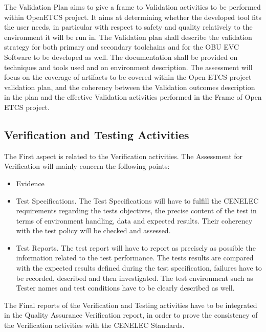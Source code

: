 \documentclass{template/openetcs_report}
\begin{document}
The Validation Plan aims to give a frame to Validation activities to be performed within OpenETCS project. It aims at determining whether the developed tool fits the user needs, in particular with respect to safety and quality relatively to the environment it will be run in.
The Validation plan shall describe the validation strategy for both primary and secondary toolchains and for the OBU EVC Software to be developed as well. The documentation shall be provided on techniques and tools used and on environment description. The assessment will focus on the coverage of artifacts to be covered within the Open ETCS project validation plan, and the coherency between the Validation outcomes description in the plan and the effective Validation activities performed in the Frame of Open ETCS project.

\subsection{Verification and Testing Activities}
The First aspect is related to the Verification activities. The Assessment for Verification will mainly concern the following points:
\begin{itemize}
\item Evidence
\item Test Specifications. The Test Specifications will have to fulfill the CENELEC requirements regarding the tests objectives, the precise content of the test in terms of environment handling, data and expected results. Their coherency with the test policy will be checked and assessed.
\item  Test Reports. The test report will have to report as precisely as possible the information related to the test performance. The tests results are compared with the expected results defined during the test specification, failures have to be recorded, described and then investigated. The test environment such as Tester names and test conditions have to be clearly described as well.
\end{itemize}
The Final reports of the Verification and Testing activities have to be integrated in the Quality Assurance Verification report, in order to prove the consistency of the Verification activities with the CENELEC Standards.
\end{document}

